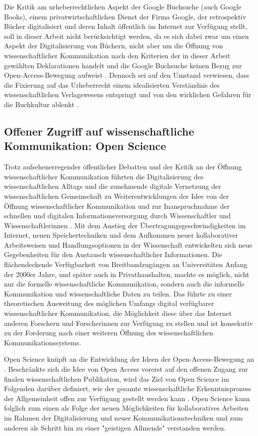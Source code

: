 Die Kritik am urheberrechtlichen Aspekt der Google Buchsuche (auch Google Books), einem privatwirtschaftlichen Dienst der Firma Google, der retrospektiv Bücher digitalisiert und deren Inhalt öffentlich im Internet zur Verfügung stellt, soll in dieser Arbeit nicht berücksichtigt werden, da es sich dabei zwar um einen Aspekt der Digitalisierung von Büchern, nicht aber um die Öffnung von wissenschaftlicher Kommunikation nach den Kriterien der in dieser Arbeit gewählten Deklarationen handelt und die Google Buchsuche keinen Bezug zur Open-Access-Bewegung aufweist \cite{Hagner_2015}. Dennoch sei auf den Umstand verwiesen, dass die Fixierung auf das Urheberrecht einem idealisierten Verständnis des wissenschaftlichen Verlagswesens entspringt und von den wirklichen Gefahren für die Buchkultur ablenkt \cite[:6]{Hirschi_2015}.

\subsection{Offener Zugriff auf wissenschaftliche Kommunikation: Open Science}

Trotz aufsehenerregender öffentlicher Debatten und der Kritik an der Öffnung wissenschaftlicher Kommunikation führten die Digitalisierung des wissenschaftlichen Alltags und die zunehmende digitale Vernetzung der wissenschaftlichen Gemeinschaft zu Weiterentwicklungen der Idee von der Öffnung wissenschaftlicher Kommunikation und zur Inanspruchnahme der schnellen und digitalen Informationsversorgung durch Wissenschaftler und Wissenschaftlerinnen \cite{Winkler_2011}. Mit dem Anstieg der Übertragungsgeschwindigkeiten im Internet, neuen Speichertechniken und dem Aufkommen neuer kollaborativer Arbeitsweisen und Handlungsoptionen in der Wissenschaft entwickelten sich neue Gegebenheiten für den Austausch wissenschaftlicher Informationen. Die flächendeckende Verfügbarkeit von Breitbandzugängen an Universitäten Anfang der 2000er Jahre, und später auch in Privathaushalten, machte es möglich, nicht nur die formelle wissenschaftliche Kommunikation, sondern auch die informelle Kommunikation und wissenschaftliche Daten zu teilen. Das führte zu einer theoretischen Ausweitung des möglichen Umfangs digital verfügbarer wissenschaftlicher Kommunikation, die Möglichkeit diese über das Internet anderen Forschern und Forscherinnen zur Verfügung zu stellen und ist konsekutiv zu der Forderung nach einer weiteren Öffnung des wissenschaftlichen Kommunikationssystems.

Open Science knüpft an die Entwicklung der Ideen der Open-Access-Bewegung an \cite{Garcia_2010}. Beschränkte sich die Idee von Open Access vorerst auf den offenen Zugang zur finalen wissenschaftlichen Publikation, wird das Ziel von Open Science im Folgenden darüber definiert, wie der gesamte wissenschaftliche Erkenntnisprozess der Allgemeinheit offen zur Verfügung gestellt werden kann \cite{Grand_2012}. Open Science kann folglich zum einen als Folge der neuen Möglichkeiten für kollaboratives Arbeiten im Rahmen der Digitalisierung und neuer Kommunikationstechniken und zum anderen als Schritt hin zu einer "geistigen Allmende" \cite{Naeder_2010} verstanden werden.

